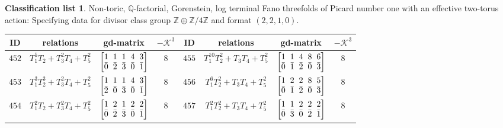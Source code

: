 \documentclass[10pt,a4paper]{amsart}
\theoremstyle{definition}
\newtheorem{class-list}[thm]{Classification list}
\def\ZZ{{\mathbb Z}}
\def\QQ{{\mathbb Q}}
\numberwithin{equation}{section}
\begin{document}
\begin{class-list}\label{class-list(0,4)}
Non-toric, $\QQ$-factorial, Gorenstein, log terminal Fano
threefolds of Picard number one with an effective two-torus action:
Specifying data for divisor class group $\ZZ\oplus \ZZ/4\ZZ$ and
format $(2,2,1,0)$.
\begin{table}[h!]\centering\setlength{\tabcolsep}{3.5pt}
\renewcommand{\arraystretch}{1.35}\small\tabulinesep=1mm
\begin{tabu}{c|c|c|c||c|c|c|c}
\hline
ID&relations&gd-matrix&$-\mathcal{K}^3$&ID&relations&gd-matrix&$-\mathcal{K}^3$
\\
\hline
${452}$&${T_{1}^{5}T_{2}+T_{3}^{2}T_{4}+T_{5}^{2}}$
&$\arraycolsep=1mm\begin{bmatrix}{1} & {1} & {1} & {4} & {3} \\ {\bar{0}} & {\bar{2}} & {\bar{3}} & {\bar{0}} & {\bar{1}}\end{bmatrix}$&${8}$
&${455}$&${T_{1}^{10}T_{2}^{2}+T_{3}T_{4}+T_{5}^{2}}$
&$\arraycolsep=1mm\begin{bmatrix}{1} & {1} & {4} & {8} & {6} \\ {\bar{0}} & {\bar{1}} & {\bar{2}} & {\bar{0}} & {\bar{3}}\end{bmatrix}$&${8}$
\\
\hline
${453}$&${T_{1}^{3}T_{2}^{3}+T_{3}^{2}T_{4}+T_{5}^{2}}$
&$\arraycolsep=1mm\begin{bmatrix}{1} & {1} & {1} & {4} & {3} \\ {\bar{2}} & {\bar{0}} & {\bar{3}} & {\bar{0}} & {\bar{1}}\end{bmatrix}$&${8}$
&${456}$&${T_{1}^{6}T_{2}^{2}+T_{3}T_{4}+T_{5}^{2}}$
&$\arraycolsep=1mm\begin{bmatrix}{1} & {2} & {2} & {8} & {5} \\ {\bar{0}} & {\bar{1}} & {\bar{2}} & {\bar{0}} & {\bar{3}}\end{bmatrix}$&${8}$
\\
\hline
${454}$&${T_{1}^{2}T_{2}+T_{3}^{2}T_{4}+T_{5}^{2}}$
&$\arraycolsep=1mm\begin{bmatrix}{1} & {2} & {1} & {2} & {2} \\ {\bar{0}} & {\bar{2}} & {\bar{3}} & {\bar{0}} & {\bar{1}}\end{bmatrix}$&${8}$
&${457}$&${T_{1}^{2}T_{2}^{2}+T_{3}T_{4}+T_{5}^{2}}$
&$\arraycolsep=1mm\begin{bmatrix}{1} & {1} & {2} & {2} & {2} \\ {\bar{0}} & {\bar{3}} & {\bar{0}} & {\bar{2}} & {\bar{1}}\end{bmatrix}$&${8}$
\\
\hline
\end{tabu}\vspace{4mm}
\end{table}
\end{class-list}
\end{document}
